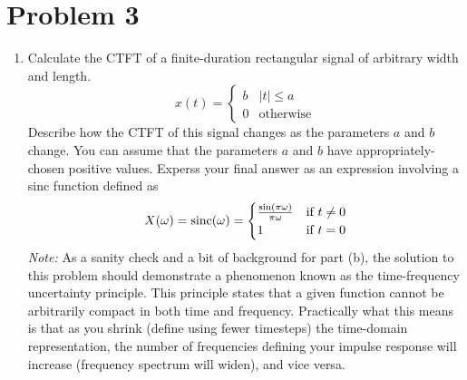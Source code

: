 \documentclass[10pt]{article}
\newcommand{\sinc}{\mathrm{sinc}}
\begin{document}
	\section*{Problem 3}
	\begin{enumerate}[label=\alph*)]
		\item Calculate the CTFT of a finite-duration rectangular signal of arbitrary width and length. 
			\[
			x(t) = \begin{cases}
				b & |t| \le a\\
				0 & \text{otherwise}
			\end{cases}
			\] 
			Describe how the CTFT of this signal changes as the parameters \( a \) and \( b \) change. You can 
			assume that the parameters \( a \) and \( b \) have appropriately-chosen positive values. Experss your 
			final answer as an expression involving a sinc function defined as
			\[
			X(\omega) = \sinc(\omega) = \begin{cases}
				\frac{\sin(\pi \omega)}{\pi \omega} & \text{if \( t \neq 0 \)}\\
				1 & \text{if \( t =0 \)}
			\end{cases}
			\] 
			\textit{Note:} As a sanity check and a bit of background for part (b), the solution to this problem 
			should demonstrate a phenomenon known as the time-frequency uncertainty principle. This principle 
			states that a given function cannot be arbitrarily compact in both time and frequency. Practically 
			what this means is that as you shrink (define using fewer timesteps) the time-domain representation, 
			the number of frequencies defining your impulse response will increase (frequency spectrum will widen), 
			and vice versa. 


\end{enumerate}
\end{document}
